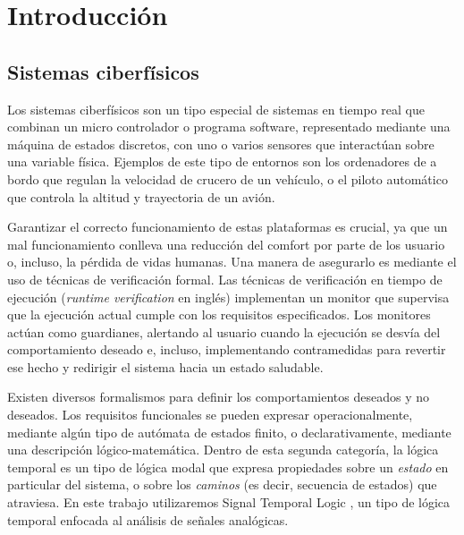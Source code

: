 %
%
%

\chapter{Introducción}

\section{Sistemas ciberfísicos}
Los sistemas ciberfísicos son un tipo especial de sistemas en tiempo real que combinan un micro controlador o programa software, representado mediante una máquina de estados discretos, con uno o varios sensores que interactúan sobre una variable física. Ejemplos de este tipo de entornos son los ordenadores de a bordo que regulan la velocidad de crucero de un vehículo, o el piloto automático que controla la altitud y trayectoria de un avión.

Garantizar el correcto funcionamiento de estas plataformas es crucial, ya que un mal funcionamiento conlleva una reducción del comfort por parte de los usuario o, incluso, la pérdida de vidas humanas. Una manera de asegurarlo es mediante el uso de técnicas de verificación formal. Las técnicas de verificación en tiempo de ejecución \cite{STTT_RV_21} (\emph{runtime verification} en inglés) implementan un monitor que supervisa que la ejecución actual cumple con los requisitos especificados. Los monitores actúan como guardianes, alertando al usuario cuando la ejecución se desvía del comportamiento deseado e, incluso, implementando contramedidas para revertir ese hecho y redirigir el sistema hacia un estado saludable. 

Existen diversos formalismos para definir los comportamientos deseados y no deseados. Los requisitos funcionales se pueden expresar operacionalmente, mediante algún tipo de autómata de estados finito, o declarativamente, mediante una descripción lógico-matemática. Dentro de esta segunda categoría, la lógica temporal es un tipo de lógica modal que expresa propiedades sobre un \emph{estado} en particular del sistema, o sobre los \emph{caminos} (es decir, secuencia de estados) que atraviesa. En este trabajo utilizaremos Signal Temporal Logic \cite{STL}, un tipo de lógica temporal enfocada al análisis de señales analógicas.

